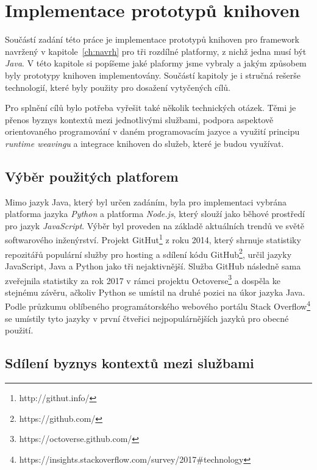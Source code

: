 \usepackage[T1]{fontenc}
\usepackage[utf8]{inputenc}


\chapter{Implementace prototypů knihoven}\label{ch:implementace}

Součástí zadání této práce je implementace prototypů
knihoven pro framework navržený v kapitole~\ref{ch:navrh}
pro tři rozdílné platformy, z nichž jedna musí být \textit{Java}.
V této kapitole si popíšeme jaké plaformy jsme vybraly a jakým
způsobem byly prototypy knihoven implementovány. Součástí
kapitoly je i stručná rešerše technologií, které byly použity
pro dosažení vytyčených cílů.

Pro splnění cílů bylo potřeba vyřešit také několik technických otázek.
Těmi je přenos byznys kontextů mezi jednotlivými službami, podpora
aspektově orientovaného programování v daném programovacím jazyce
a využití principu \textit{runtime weavingu} a integrace knihoven
do služeb, které je budou využívat.

\section{Výběr použitých platforem}

Mimo jazyk Java, který byl určen zadáním, byla pro
implementaci vybrána platforma jazyka \textit{Python}
a platforma \textit{Node.js}, který slouží jako
běhové prostředí pro jazyk \textit{JavaScript}.
Výběr byl proveden na základě aktuálních trendů
ve světě softwarového inženýrství. Projekt GitHut\footnote{http://githut.info/}
z roku 2014, který shrnuje statistiky repozitářů
populární služby pro hosting a sdílení kódu
GitHub\footnote{https://github.com/}, určil
jazyky JavaScript, Java a Python jako tři nejaktivnější.
Služba GitHub následně sama zveřejnila statistiky za rok 2017
v rámci projektu Octoverse\footnote{https://octoverse.github.com/}
a dospěla ke stejnému závěru, ačkoliv Python se umístil na druhé
pozici na úkor jazyka Java. Podle průzkumu oblíbeného
programátorského webového portálu Stack
Overflow\footnote{https://insights.stackoverflow.com/survey/2017\#technology}
se umístily tyto jazyky v první čtveřici nejpopulárnějších jazyků pro obecné použití.

\section{Sdílení byznys kontextů mezi službami}

